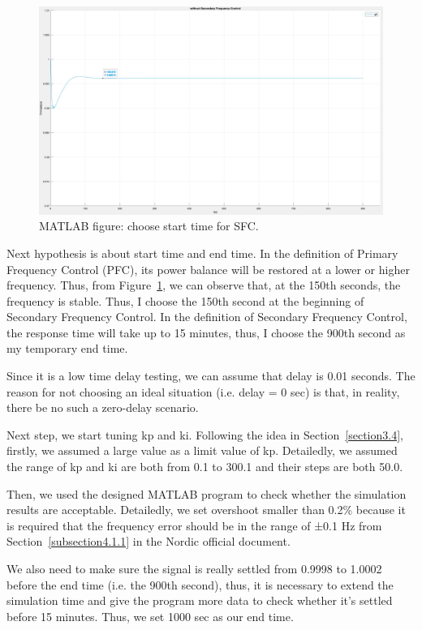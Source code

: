 \begin{figure}[htbp]
\centering
\includegraphics[width = .891\textwidth]{figure/4_1_1_without3.jpeg}
\caption{MATLAB figure: choose start time for SFC.}
\label{4_1_1_without3}
\end{figure}
Next hypothesis is about start time and end time. In the definition of Primary Frequency Control (PFC), its power balance will be restored at a lower or higher frequency. Thus, from Figure~\ref{4_1_1_without3}, we can observe that, at the 150th seconds, the frequency is stable. Thus, I choose the 150th second at the beginning of Secondary Frequency Control. In the definition of Secondary Frequency Control, the response time will take up to 15 minutes, thus, I choose the 900th second as my temporary end time. 

Since it is a low time delay testing, we can assume that delay is 0.01 seconds. The reason for not choosing an ideal situation (i.e. delay = 0 sec) is that, in reality, there be no such a zero-delay scenario. 

Next step, we start tuning kp and ki. Following the idea in Section~\ref{section3.4}, firstly, we assumed a large value as a limit value of kp. Detailedly, we assumed the range of kp and ki are both from 0.1 to 300.1 and their steps are both 50.0.  

Then, we used the designed MATLAB program to check whether the simulation results are acceptable. Detailedly, we set overshoot smaller than 0.2\% because it is required that the frequency error should be in the range of ±0.1 Hz from Section~\ref{subsection4.1.1} in the Nordic official document. 

We also need to make sure the signal is really settled from 0.9998 to 1.0002 before the end time (i.e. the 900th second), thus, it is necessary to extend the simulation time and give the program more data to check whether it's settled before 15 minutes. Thus, we set 1000 sec as our end time.

